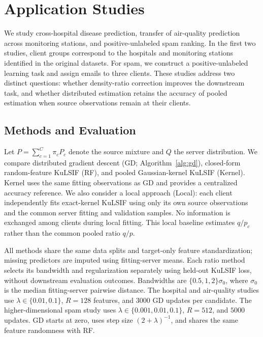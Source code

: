\section{Application Studies}\label{Sec: applications}

We study cross-hospital disease prediction, transfer of air-quality prediction
across monitoring stations, and positive-unlabeled spam ranking. In the first
two studies, client groups correspond to the hospitals and monitoring stations
identified in the original datasets. For spam, we construct a positive-unlabeled
learning task and assign emails to three clients. These studies
address two distinct questions: whether density-ratio correction improves the
downstream task, and whether distributed estimation retains the accuracy of
pooled estimation when source observations remain at their clients.

\subsection{Methods and Evaluation}

Let $P=\sum_{c=1}^C\pi_cP_c$ denote the source mixture and $Q$ the server
distribution. We compare distributed gradient descent (GD;
Algorithm~\ref{alg:gd}), closed-form random-feature KuLSIF (RF), and pooled
Gaussian-kernel KuLSIF (Kernel). Kernel uses the same fitting observations as
GD and provides a centralized accuracy reference. We also consider a local
approach (Local):
each client independently fits exact-kernel KuLSIF using only its own source
observations and the common server fitting and validation samples. No
information is exchanged among clients during local fitting. This local
baseline estimates $q/p_c$ rather than the common pooled ratio $q/p$.

All methods share the same data splits and target-only feature standardization;
missing predictors are imputed using fitting-server means. Each ratio method
selects its bandwidth and regularization separately using held-out KuLSIF
loss, without downstream evaluation outcomes. Bandwidths are
$\{0.5,1,2\}\sigma_0$, where $\sigma_0$ is the median fitting-server
pairwise distance. The hospital and air-quality studies use
$\lambda\in\{0.01,0.1\}$, $R=128$ features, and $3000$ GD updates per
candidate. The higher-dimensional spam study uses
$\lambda\in\{0.001,0.01,0.1\}$, $R=512$, and $5000$ updates. GD starts
at zero, uses step size $(2+\lambda)^{-1}$, and shares the same feature
randomness with RF.

